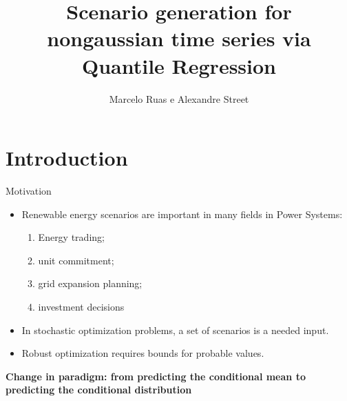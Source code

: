 \documentclass[11pt]{beamer}
\begin{document}
\author{Marcelo Ruas e Alexandre Street}
\title{Scenario generation for nongaussian time series via Quantile Regression}
\begin{frame}[plain]
\maketitle
\end{frame}






\section{Introduction}\label{introduction}

\begin{frame}{Motivation}

\begin{itemize}
	\item
	Renewable energy scenarios are important in many fields in Power
	Systems:
	
	\begin{enumerate}
		\def\labelenumi{\roman{enumi})}
		
		\item
		Energy trading;
		\item
		unit commitment;
		\item
		grid expansion planning;
		\item
		investment decisions
	\end{enumerate}
	\item
	In stochastic optimization problems, a set of scenarios is a needed
	input.
	\item
	Robust optimization requires bounds for probable values.
\end{itemize}

\textbf{Change in paradigm: from predicting the conditional mean to
	predicting the conditional distribution}

\end{frame}
\end{document}
